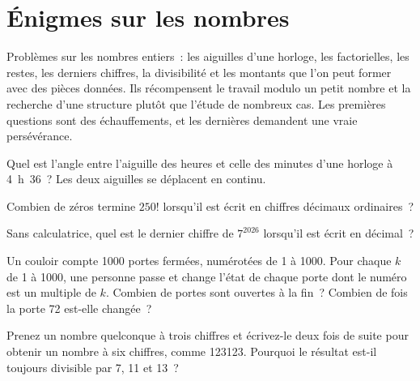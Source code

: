 \chapter{Énigmes sur les nombres}\label{ch:iv1:number-riddles}

\begin{ivtrains}
Problèmes sur les nombres entiers~: les aiguilles d'une horloge, les factorielles, les restes, les derniers chiffres, la divisibilité et les montants que l'on peut former avec des pièces données. Ils récompensent le travail modulo un petit nombre et la recherche d'une structure plutôt que l'étude de nombreux cas. Les premières questions sont des échauffements, et les dernières demandent une vraie persévérance.
\end{ivtrains}

\begin{question}\label{iq:iv1:number-riddles:1}
Quel est l'angle entre l'aiguille des heures et celle des minutes d'une horloge à 4~h~36~? Les deux aiguilles se déplacent en continu.
\end{question}

\begin{question}\label{iq:iv1:number-riddles:2}
Combien de zéros termine $250!$ lorsqu'il est écrit en chiffres décimaux ordinaires~?
\end{question}

\begin{question}\label{iq:iv1:number-riddles:3}
Sans calculatrice, quel est le dernier chiffre de $7^{2026}$ lorsqu'il est écrit en décimal~?
\end{question}

\begin{question}\label{iq:iv1:number-riddles:4}
Un couloir compte 1000 portes fermées, numérotées de 1 à 1000. Pour chaque $k$ de 1 à 1000, une personne passe et change l'état de chaque porte dont le numéro est un multiple de $k$. Combien de portes sont ouvertes à la fin~? Combien de fois la porte 72 est-elle changée~?
\end{question}

\begin{question}\label{iq:iv1:number-riddles:5}
Prenez un nombre quelconque à trois chiffres et écrivez-le deux fois de suite pour obtenir un nombre à six chiffres, comme 123123. Pourquoi le résultat est-il toujours divisible par 7, 11 et 13~?
\end{question}

